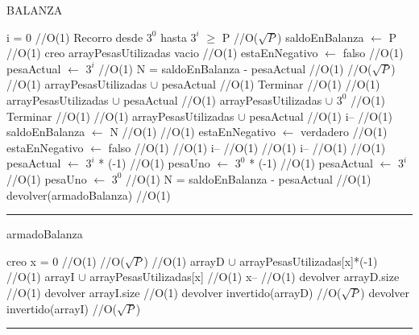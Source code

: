 \begin{algorithm}[H]
\caption{BALANZA}
\begin{algorithmic}[1]
\state i = 0 \hfill //O(1)
\state Recorro desde $3^0$ hasta $3^i$ $\geq$ P  \hfill //O($\sqrt{P}$)
\state saldoEnBalanza  $\gets$ P \hfill //O(1)
\state creo arrayPesasUtilizadas vacio \hfill //O(1)
\state estaEnNegativo $\gets$ falso \hfill //O(1)
\state pesaActual  $\gets$  {$3^i$} \hfill //O(1)
\state N = saldoEnBalanza - pesaActual \hfill //O(1)
 \hfill //O($\sqrt{P}$)
 \hfill //O(1)
\state arrayPesasUtilizadas $\cup$ pesaActual \hfill //O(1)
\state Terminar \hfill //O(1)
\endif
{} \hfill //O(1)
\state arrayPesasUtilizadas $\cup$ pesaActual \hfill //O(1)
\state arrayPesasUtilizadas $\cup$ {$3^0$} \hfill //O(1)
\state Terminar \hfill //O(1)
\endif
{} \hfill //O(1)
\state arrayPesasUtilizadas $\cup$ pesaActual \hfill //O(1)
\state i-- \hfill //O(1)
\state saldoEnBalanza $\gets$ N \hfill //O(1)
 \hfill //O(1)
\state estaEnNegativo $\gets$  verdadero \hfill //O(1)
\Else
\state estaEnNegativo $\gets$  falso \hfill //O(1)
\endif
\endif
{} \hfill //O(1)
\state i-- \hfill //O(1)
\endif
{} \hfill //O(1)
\state i-- \hfill //O(1)
\endif
{} \hfill //O(1)
\state pesaActual  $\gets$  {$3^i$} * (-1) \hfill //O(1)
\state pesaUno  $\gets$  {$3^0$} * (-1) \hfill //O(1)
\Else
\state pesaActual  $\gets$  {$3^i$} \hfill //O(1)
\state pesaUno  $\gets$  {$3^0$}  \hfill //O(1)
\endif
\state N = saldoEnBalanza - pesaActual \hfill //O(1)
\endwhile
\state devolver(armadoBalanza) \hfill //O(1)
\EndFunction 
\end{algorithmic}
\hrule
{}
\end{algorithm}

\begin{algorithm}[H]
\caption{armadoBalanza}
\begin{algorithmic}[1]
\state creo x = 0 \hfill //O(1)
 \hfill //O($\sqrt{P}$)
 \hfill //O(1)
\state arrayD $\cup$ arrayPesasUtilizadas[x]*(-1) \hfill //O(1)
\Else
\state arrayI $\cup$ arrayPesasUtilizadas[x] \hfill //O(1)
\endif
\state x-- \hfill //O(1)
\endwhile
\state devolver arrayD.size \hfill //O(1)
\state devolver arrayI.size \hfill //O(1)
\state devolver invertido(arrayD) \hfill //O($\sqrt{P}$)
\state devolver invertido(arrayI) \hfill //O($\sqrt{P}$)
\EndFunction 
\end{algorithmic}
\hrule
{}
\end{algorithm}